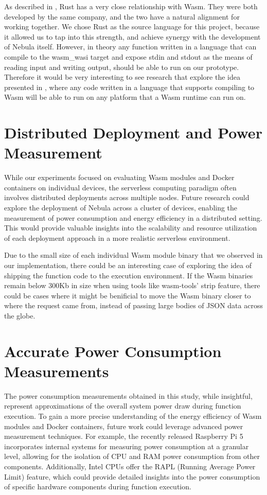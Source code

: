 \documentclass[
  table]{report}
\begin{document}
As described in , Rust has a very close
relationship with \ac{Wasm}. They were both developed by the same
company, and the two have a natural alignment for working together. We
chose Rust as the source language for this project, because it allowed
us to tap into this strength, and achieve synergy with the development
of Nebula itself. However, in theory any function written in a language
that can compile to the wasm\_wasi target and expose stdin and stdout as
the means of reading input and writing output, should be able to run on
our prototype. Therefore it would be very interesting to see research
that explore the idea presented in , where any
code written in a language that supports compiling to \ac{Wasm} will be
able to run on any platform that a \ac{Wasm} runtime can run on.

\section{Distributed Deployment and Power Measurement}

While our experiments focused on evaluating Wasm modules and Docker
containers on individual devices, the serverless computing paradigm
often involves distributed deployments across multiple nodes. Future
research could explore the deployment of Nebula across a cluster of
devices, enabling the measurement of power consumption and energy
efficiency in a distributed setting. This would provide valuable
insights into the scalability and resource utilization of each
deployment approach in a more realistic serverless environment.

Due to the small size of each individual \ac{Wasm} module binary that we
observed in our implementation, there could be an interesting case of
exploring the idea of shipping the function code to the execution
environment. If the \ac{Wasm} binaries remain below 300Kb in size when
using tools like wasm-tools' strip feature, there could be cases where
it might be benificial to move the \ac{Wasm} binary closer to where the
request came from, instead of passing large bodies of JSON data across
the globe.

\section{Accurate Power Consumption Measurements}

The power consumption measurements obtained in this study, while
insightful, represent approximations of the overall system power draw
during function execution. To gain a more precise understanding of the
energy efficiency of Wasm modules and Docker containers, future work
could leverage advanced power measurement techniques. For example, the
recently released Raspberry Pi 5 incorporates internal systems for
measuring power consumption at a granular level, allowing for the
isolation of CPU and RAM power consumption from other components.
Additionally, Intel CPUs offer the RAPL (Running Average Power Limit)
feature, which could provide detailed insights into the power
consumption of specific hardware components during function execution.
\end{document}
